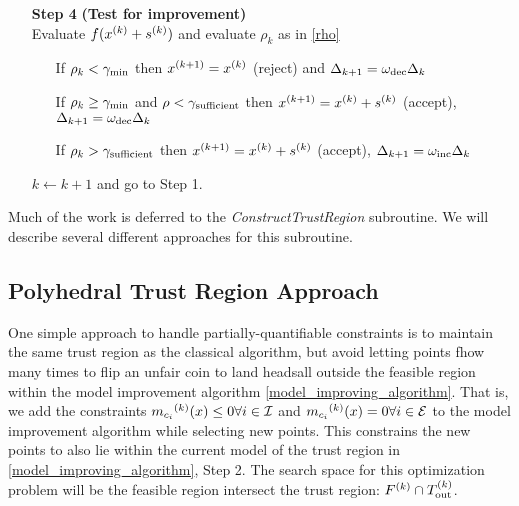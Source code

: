\begin{algorithm}[H]
\begin{itemize}
        \item[\textbf{Step 4}] \textbf{(Test for improvement)} \\
            Evaluate $f({x}^{(k)} + {{s}^{(k)}})$ and evaluate $\rho_k$ as in \cref{rho} \begin{itemize}
                \item[] If $\rho_k < \gamma_{\text{min}}$ then ${x}^{(k+1)}={x}^{(k)}$ (reject) and $\Delta_{k+1} = \omega_{\text{dec}}\Delta_{k}$
                \item[] If $\rho_k \ge \gamma_{\text{min}}$ and $\rho < \gamma_{\text{sufficient}}$ then ${x}^{(k+1)}={x}^{(k)}+{{s}^{(k)}}$ (accept), $\Delta_{k+1} = \omega_{\text{dec}}\Delta_{k}$
                \item[] If $\rho_k > \gamma_{\text{sufficient}}$ then ${x}^{(k+1)}={x}^{(k)}+{{s}^{(k)}}$ (accept), $\Delta_{k+1} = \omega_{\text{inc}}\Delta_{k}$
            \end{itemize}
            $k \gets k+1$ and go to Step 1.
    \end{itemize}
\end{algorithm}

 

Much of the work is deferred to the \emph{ConstructTrustRegion} subroutine.
We will describe several different approaches for this subroutine.



\subsection{Polyhedral Trust Region Approach}
One simple approach to handle partially-quantifiable constraints is to maintain the same trust region as the classical algorithm, but avoid letting points fhow many times to flip an unfair coin to land headsall outside the feasible region within the model improvement algorithm \cref{model_improving_algorithm}.
That is, we add the constraints ${{m}_{c_i}}^{(k)}(x) \le 0 \forall i \in \mathcal{I}$ and ${{m}_{c_i}}^{(k)}(x) = 0 \forall i \in \mathcal{E}$ to the model improvement algorithm while selecting new points.
This constrains the new points to also lie within the current model of the trust region in \cref{model_improving_algorithm}, Step 2.
The search space for this optimization problem will be the feasible region intersect the trust region: ${F}^{(k)} \cap {T_{\text{out}}^{(k)}} $.

